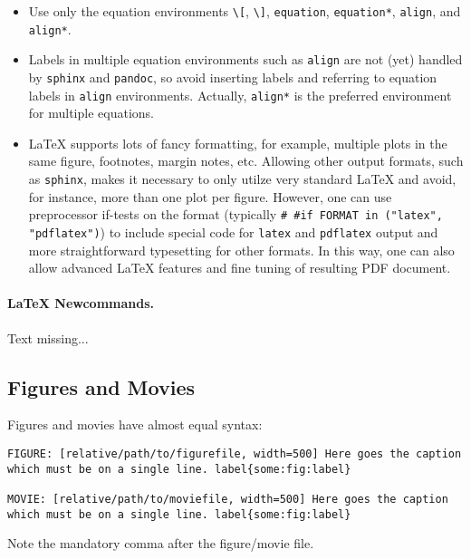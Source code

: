 \documentclass[%
oneside,                 %
final,                   %
10pt]{article}
\begin{document}
\begin{itemize}
  \item Use only the equation environments \Verb!\[!, \Verb!\]!,
    \Verb!equation!, \Verb!equation*!, \Verb!align!, and \Verb!align*!.

  \item Labels in multiple equation environments such as \Verb!align! are
    not (yet) handled by \Verb!sphinx! and \Verb!pandoc!, so avoid inserting
    labels and referring  to equation labels in \Verb!align! environments.
    Actually, \Verb!align*! is the preferred environment for multiple equations.

  \item {\LaTeX} supports lots of fancy formatting, for example, multiple
    plots in the same figure, footnotes, margin notes, etc.
    Allowing other output formats, such as \Verb!sphinx!, makes it necessary
    to only utilze very standard {\LaTeX} and avoid, for instance, more than
    one plot per figure. However, one can use preprocessor if-tests on
    the format (typically \Verb!# #if FORMAT in ("latex", "pdflatex")!) to
    include special code for \Verb!latex! and \Verb!pdflatex! output and more
    straightforward typesetting for other formats. In this way, one can
    also allow advanced {\LaTeX} features and fine tuning of resulting
    PDF document.
\end{itemize}

\noindent
\paragraph{LaTeX Newcommands.}
Text missing...

\subsection{Figures and Movies}

Figures and movies have almost equal syntax:
\begin{Verbatim}[numbers=none,fontsize=\fontsize{9pt}{9pt},baselinestretch=0.85,xleftmargin=0mm]
FIGURE: [relative/path/to/figurefile, width=500] Here goes the caption which must be on a single line. label{some:fig:label}

MOVIE: [relative/path/to/moviefile, width=500] Here goes the caption which must be on a single line. label{some:fig:label}

\end{Verbatim}
Note the mandatory comma after the figure/movie file.
\end{document}
